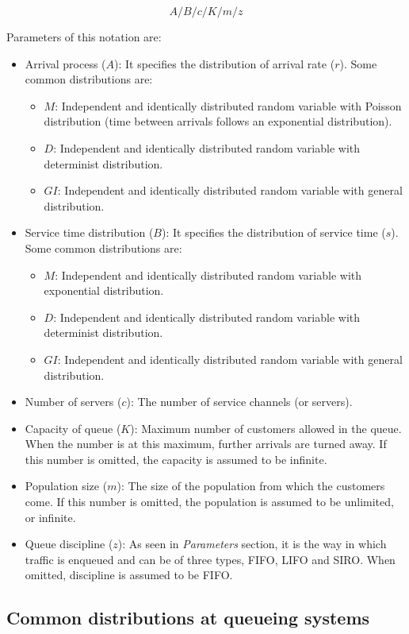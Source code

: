 \documentclass[
	12pt,
	twoside
]{book}
\begin{document}
$$
	A / B / c / K / m / z
$$

Parameters of this notation are:

\begin{itemize}
	\item {
		Arrival process ($A$): It specifies the distribution of arrival rate ($r$). Some common distributions are:
		\begin{itemize}
			\item $M$: Independent and identically distributed random variable with Poisson distribution (time between arrivals follows an exponential distribution).
			\item $D$: Independent and identically distributed random variable with determinist distribution.
			\item $GI$: Independent and identically distributed random variable with general distribution.
		\end{itemize}
	}
	\item {
		Service time distribution ($B$): It specifies the distribution of service time ($s$). Some common distributions are:
		\begin{itemize}
			\item $M$: Independent and identically distributed random variable with exponential distribution.
			\item $D$: Independent and identically distributed random variable with determinist distribution.
			\item $GI$: Independent and identically distributed random variable with general distribution.
		\end{itemize}
	}
	\item Number of servers ($c$): The number of service channels (or servers).
	\item Capacity of queue ($K$): Maximum number of customers allowed in the queue. When the number is at this maximum, further arrivals are turned away. If this number is omitted, the capacity is assumed to be infinite.
	\item Population size ($m$): The size of the population from which the customers come. If this number is omitted, the population is assumed to be unlimited, or infinite.
	\item Queue discipline ($z$): As seen in \textit{Parameters} section, it is the way in which traffic is enqueued and can be of three types, FIFO, LIFO and SIRO. When omitted, discipline is assumed to be FIFO.
\end{itemize}

\subsection{Common distributions at queueing systems}
\end{document}
